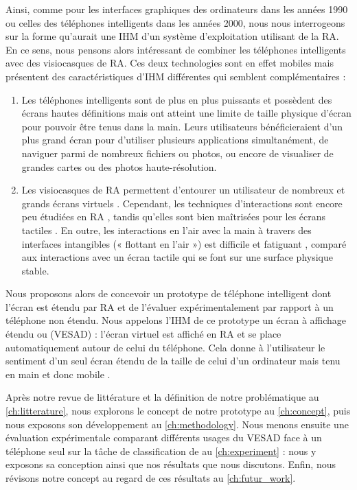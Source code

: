 Ainsi, comme pour les interfaces graphiques des ordinateurs dans les années 1990 ou celles des téléphones intelligents dans les années 2000, nous nous interrogeons sur la forme qu'aurait une IHM d'un système d'exploitation utilisant de la RA. En ce sens, nous pensons alors intéressant de combiner les téléphones intelligents avec des visiocasques de RA. Ces deux technologies sont en effet mobiles mais présentent des caractéristiques d'IHM différentes qui semblent complémentaires :
\begin{enumerate}
  \item Les téléphones intelligents sont de plus en plus puissants et possèdent des écrans hautes définitions mais ont atteint une limite de taille physique d'écran pour pouvoir être tenus dans la main. Leurs utilisateurs bénéficieraient d'un plus grand écran pour d'utiliser plusieurs applications simultanément, de naviguer parmi de nombreux fichiers ou photos, ou encore de visualiser de grandes cartes ou des photos haute-résolution.
  \item Les visiocasques de RA permettent d'entourer un utilisateur de nombreux et grands écrans virtuels \citep{Ens2014}. Cependant, 
  les techniques d'interactions sont encore peu étudiées en RA \citep{Piumsomboon2013}, tandis qu'elles sont bien maîtrisées pour les écrans tactiles \citep{Wobbrock2009}. En outre, les interactions en l'air avec la main à travers des interfaces intangibles (« flottant en l'air ») est difficile \citep{Chan2010} et fatiguant \citep{Hincapie-Ramos2014}, comparé aux interactions avec un écran tactile qui se font sur une surface physique stable.
\end{enumerate}
\bigskip


Nous proposons alors de concevoir un prototype de téléphone intelligent dont l'écran est étendu par RA et de l'évaluer expérimentalement par rapport à un téléphone non étendu. Nous appelons l'IHM de ce prototype un écran à affichage étendu ou  (VESAD) : l'écran virtuel est affiché en RA et se place automatiquement autour de celui du téléphone. Cela donne à l'utilisateur le sentiment d'un seul écran étendu de la taille de celui d'un ordinateur mais tenu en main et donc mobile .

Après notre revue de littérature et la définition de notre problématique au \autoref{ch:litterature}, nous explorons le concept de notre prototype au \autoref{ch:concept}, puis nous exposons son développement au \autoref{ch:methodology}. Nous menons ensuite une évaluation expérimentale comparant différents usages du VESAD face à un téléphone seul sur la tâche de classification de \cite{Liu2014} au \autoref{ch:experiment} : nous y exposons sa conception ainsi que nos résultats que nous discutons. Enfin, nous révisons notre concept au regard de ces résultats au \autoref{ch:futur_work}.